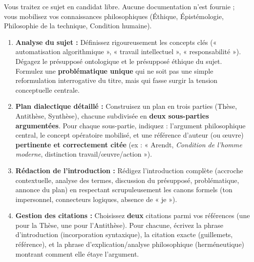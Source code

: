 \documentclass[11pt]{article}
\begin{document}
\begin{exercice}
Vous traitez ce sujet en candidat libre. Aucune documentation n'est fournie ; vous mobilisez vos connaissances philosophiques (Éthique, Épistémologie, Philosophie de la technique, Condition humaine).
\begin{enumerate}
    \item \textbf{Analyse du sujet :} Définissez rigoureusement les concepts clés (« automatisation algorithmique », « travail intellectuel », « responsabilité »). Dégagez le présupposé ontologique et le présupposé éthique du sujet. Formulez une \textbf{problématique unique} qui ne soit pas une simple reformulation interrogative du titre, mais qui fasse surgir la tension conceptuelle centrale.
    \item \textbf{Plan dialectique détaillé :} Construisez un plan en trois parties (Thèse, Antithèse, Synthèse), chacune subdivisée en \textbf{deux sous-parties argumentées}. Pour chaque sous-partie, indiquez : l'argument philosophique central, le concept opératoire mobilisé, et une référence d'auteur (ou œuvre) \textbf{pertinente et correctement citée} (ex : « Arendt, \textit{Condition de l'homme moderne}, distinction travail/œuvre/action »).
    \item \textbf{Rédaction de l'introduction :} Rédigez l'introduction complète (accroche contextuelle, analyse des termes, discussion du présupposé, problématique, annonce du plan) en respectant scrupuleusement les canons formels (ton impersonnel, connecteurs logiques, absence de « je »).
    \item \textbf{Gestion des citations :} Choisissez \textbf{deux} citations parmi vos références (une pour la Thèse, une pour l'Antithèse). Pour chacune, écrivez la phrase d'introduction (incorporation syntaxique), la citation exacte (guillemets, référence), et la phrase d'explication/analyse philosophique (herméneutique) montrant comment elle étaye l'argument.
\end{enumerate}
\end{exercice}
\end{document}
